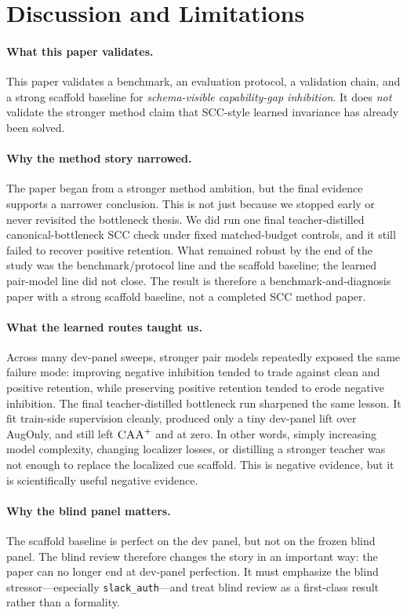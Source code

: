 \section{Discussion and Limitations}
\label{sec:discussion}

\paragraph{What this paper validates.}
This paper validates a benchmark, an evaluation protocol, a validation chain, and a strong scaffold baseline for \emph{schema-visible capability-gap inhibition}. It does \emph{not} validate the stronger method claim that SCC-style learned invariance has already been solved.

\paragraph{Why the method story narrowed.}
The paper began from a stronger method ambition, but the final evidence supports a narrower conclusion. This is not just because we stopped early or never revisited the bottleneck thesis. We did run one final teacher-distilled canonical-bottleneck SCC check under fixed matched-budget controls, and it still failed to recover positive retention. What remained robust by the end of the study was the benchmark/protocol line and the scaffold baseline; the learned pair-model line did not close. The result is therefore a benchmark-and-diagnosis paper with a strong scaffold baseline, not a completed SCC method paper.

\paragraph{What the learned routes taught us.}
Across many dev-panel sweeps, stronger pair models repeatedly exposed the same failure mode: improving negative inhibition tended to trade against clean and positive retention, while preserving positive retention tended to erode negative inhibition. The final teacher-distilled bottleneck run sharpened the same lesson. It fit train-side supervision cleanly, produced only a tiny dev-panel \NOS{} lift over AugOnly, and still left $\textsc{CAA}^{+}$ and \POC{} at zero. In other words, simply increasing model complexity, changing localizer losses, or distilling a stronger teacher was not enough to replace the localized cue scaffold. This is negative evidence, but it is scientifically useful negative evidence.

\paragraph{Why the blind panel matters.}
The scaffold baseline is perfect on the dev panel, but not on the frozen blind panel. The blind review therefore changes the story in an important way: the paper can no longer end at dev-panel perfection. It must emphasize the blind stressor---especially \texttt{slack\_auth}---and treat blind review as a first-class result rather than a formality.

